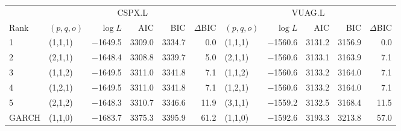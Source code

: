 \begin{tabular}{llrrrrlrrrr}
\toprule
 & \multicolumn{5}{c}{CSPX.L} & \multicolumn{5}{c}{VUAG.L} \\
\cmidrule(lr){2-6}\cmidrule(lr){7-11}
Rank & $(p,q,o)$ & $\log L$ & AIC & BIC & $\Delta$BIC & $(p,q,o)$ & $\log L$ & AIC & BIC & $\Delta$BIC \\
\midrule
1 & (1,1,1) & $-$1649.5 & 3309.0 & 3334.7 & 0.0 & (1,1,1) & $-$1560.6 & 3131.2 & 3156.9 & 0.0 \\
2 & (2,1,1) & $-$1648.4 & 3308.8 & 3339.7 & 5.0 & (2,1,1) & $-$1560.6 & 3133.1 & 3163.9 & 7.1 \\
3 & (1,1,2) & $-$1649.5 & 3311.0 & 3341.8 & 7.1 & (1,1,2) & $-$1560.6 & 3133.2 & 3164.0 & 7.1 \\
4 & (1,2,1) & $-$1649.5 & 3311.0 & 3341.8 & 7.1 & (1,2,1) & $-$1560.6 & 3133.2 & 3164.0 & 7.1 \\
5 & (2,1,2) & $-$1648.3 & 3310.7 & 3346.6 & 11.9 & (3,1,1) & $-$1559.2 & 3132.5 & 3168.4 & 11.5 \\
\midrule
GARCH & (1,1,0) & $-$1683.7 & 3375.3 & 3395.9 & 61.2 & (1,1,0) & $-$1592.6 & 3193.3 & 3213.8 & 57.0 \\
\bottomrule
\end{tabular}